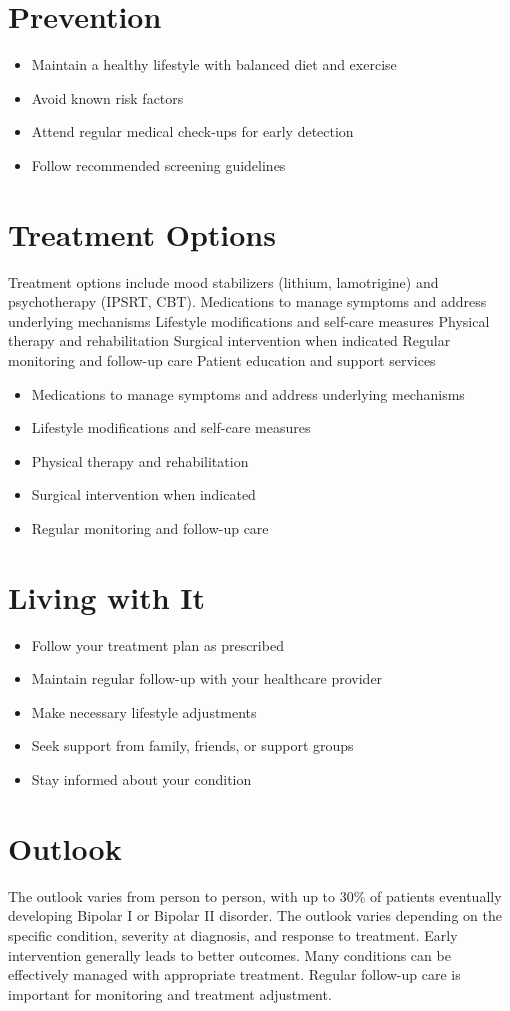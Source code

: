 \section{Prevention}
\begin{itemize}[noitemsep]
  \item Maintain a healthy lifestyle with balanced diet and exercise
  \item Avoid known risk factors
  \item Attend regular medical check-ups for early detection
  \item Follow recommended screening guidelines
\end{itemize}
\section{Treatment Options}
Treatment options include mood stabilizers (lithium, lamotrigine) and psychotherapy (IPSRT, CBT). Medications to manage symptoms and address underlying mechanisms Lifestyle modifications and self-care measures Physical therapy and rehabilitation Surgical intervention when indicated Regular monitoring and follow-up care Patient education and support services

\begin{itemize}[noitemsep]
  \item Medications to manage symptoms and address underlying mechanisms
  \item Lifestyle modifications and self-care measures
  \item Physical therapy and rehabilitation
  \item Surgical intervention when indicated
  \item Regular monitoring and follow-up care
\end{itemize}
\section{Living with It}
\begin{itemize}[noitemsep]
  \item Follow your treatment plan as prescribed
  \item Maintain regular follow-up with your healthcare provider
  \item Make necessary lifestyle adjustments
  \item Seek support from family, friends, or support groups
  \item Stay informed about your condition
\end{itemize}
\section{Outlook}
The outlook varies from person to person, with up to 30\% of patients eventually developing Bipolar I or Bipolar II disorder. The outlook varies depending on the specific condition, severity at diagnosis, and response to treatment. Early intervention generally leads to better outcomes. Many conditions can be effectively managed with appropriate treatment. Regular follow-up care is important for monitoring and treatment adjustment.
